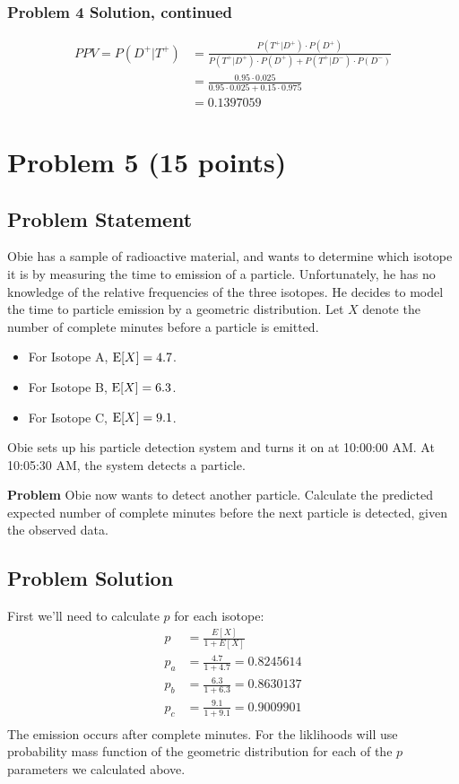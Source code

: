 \documentclass[12pt]{article}
\theoremstyle{definition}
\begin{document}
	
\newpage
\subsubsection*{Problem 4 Solution, continued}

\begin{align*}
PPV = P(D^+|T^+) &= \frac{P(T^+|D^+) \cdot P(D^+)}{P(T^+|D^+) \cdot P(D^+) + P(T^+|D^-) \cdot P(D^-)}\\
&= \frac{0.95 \cdot 0.025}{0.95 \cdot 0.025 + 0.15 \cdot 0.975}\\
&= 0.1397059
\end{align*}

\newpage
\section*{Problem 5 (15 points)}

\subsection*{Problem Statement}

Obie has a sample of radioactive material, and wants to determine which isotope it is by measuring the time to emission of a particle. Unfortunately, he has no knowledge of the relative frequencies of the three isotopes. He decides to model the time to particle emission by a geometric distribution. Let $X$ denote the number of complete minutes before a particle is emitted.
\begin{itemize}
	\item For Isotope A, $\hbox{E}[X] = 4.7$.
	\item For Isotope B, $\hbox{E}[X] = 6.3$.
	\item For Isotope C, $\hbox{E}[X] = 9.1$.
\end{itemize}
Obie sets up his particle detection system and turns it on at 10:00:00 AM. At 10:05:30 AM, the system detects a particle.

\bigskip
\noindent
{\bf Problem} Obie now wants to detect another particle. Calculate the predicted expected number of complete minutes before the next particle is detected, given the observed data.

\subsection*{Problem Solution}
First we'll need to calculate $p$ for each isotope:
\begin{align*}
p &= \frac{E[X]}{1 + E[X]}\\
p_a &= \frac{4.7}{1 + 4.7} = 0.8245614\\
p_b &= \frac{6.3}{1 + 6.3} = 0.8630137\\
p_c &= \frac{9.1}{1 + 9.1} = 0.9009901\\
\end{align*}
The emission occurs after complete minutes. For the liklihoods will use probability mass function of the geometric distribution for each of the $p$ parameters we calculated above.
\end{document}
